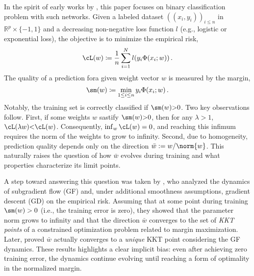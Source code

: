 In the spirit of early works by \cite{Lyu_Li_maxmargin,ji2020directional}, this paper focuses on binary classification problem with such networks. Given a labeled dataset $((x_i,y_i))_{i \leq n}$ in $\mathbb{R}^p \times \{-1, 1\}$ and a decreasing non-negative loss function $l$ (e.g., logistic or exponential loss), the objective is to minimize the empirical risk,
\begin{equation}\label{def:emp_risk_intro}
  \cL(w) \coloneqq \frac{1}{n}\sum_{i=1}^N l(y_i \Phi(x_i; w))\, .
\end{equation}
The quality of a prediction fora  given weight vector $w$ is measured by the margin,
\begin{equation}\label{def:margin_intro}
  \sm(w) \coloneqq \min_{1 \leq i \leq n} y_i \Phi(x_i;w)\, .
\end{equation}
Notably, the training set is correctly classified if $\sm(w){>}0$.
Two key observations follow. First, if some weights $w$ sastify $\sm(w){>}0$, then for any $\lambda{>}1$, $\cL(\lambda w){<}\cL(w)$. Consequently, $\inf_{w}\cL(w) = 0$, and reaching this infimum requires the norm of the weights  to grow to infinity. Second, due to homogeneity, prediction quality depends only on the direction $\bar{w} := w / \norm{w}$. This naturally raises the question of how $\bar{w}$ evolves during training and what properties characterize its limit points.

A step toward answering this question was taken by \cite{Lyu_Li_maxmargin}, who analyzed the dynamics of subgradient flow (GF) and, under additional smoothness assumptions, gradient descent (GD) on the empirical risk. Assuming that at some point during training $\sm(w) > 0$ (i.e., the training error is zero), they showed that the parameter norm grows to infinity and that the direction $\bar{w}$ converges to the set of \emph{KKT points} of a constrained optimization problem related to margin maximization. Later, \cite{ji2020directional} proved  $\bar{w}$ actually converges to a \emph{unique} KKT point considering the GF dynamics. These results highlights a clear implicit bias: even after achieving zero training error, the dynamics continue evolving until reaching a form of optimality in the normalized margin.


